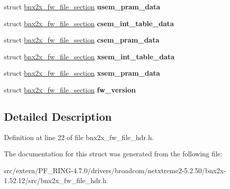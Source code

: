 \begin{DoxyCompactItemize}
\item 
\hypertarget{structbnx2x__fw__file__hdr_a993f2b8d13947e0118b306cea22eec4c}{
struct \hyperlink{structbnx2x__fw__file__section}{bnx2x\_\-fw\_\-file\_\-section} {\bfseries usem\_\-pram\_\-data}}
\label{structbnx2x__fw__file__hdr_a993f2b8d13947e0118b306cea22eec4c}

\item 
\hypertarget{structbnx2x__fw__file__hdr_a7b1ad7e3573b602c75390317b847220a}{
struct \hyperlink{structbnx2x__fw__file__section}{bnx2x\_\-fw\_\-file\_\-section} {\bfseries csem\_\-int\_\-table\_\-data}}
\label{structbnx2x__fw__file__hdr_a7b1ad7e3573b602c75390317b847220a}

\item 
\hypertarget{structbnx2x__fw__file__hdr_ac31ca45365a5720fa33b10687125d48f}{
struct \hyperlink{structbnx2x__fw__file__section}{bnx2x\_\-fw\_\-file\_\-section} {\bfseries csem\_\-pram\_\-data}}
\label{structbnx2x__fw__file__hdr_ac31ca45365a5720fa33b10687125d48f}

\item 
\hypertarget{structbnx2x__fw__file__hdr_ac17a9a4525ab60fc3e0e72f1e7219358}{
struct \hyperlink{structbnx2x__fw__file__section}{bnx2x\_\-fw\_\-file\_\-section} {\bfseries xsem\_\-int\_\-table\_\-data}}
\label{structbnx2x__fw__file__hdr_ac17a9a4525ab60fc3e0e72f1e7219358}

\item 
\hypertarget{structbnx2x__fw__file__hdr_ad24baadc62d1c58d7312791c31cde7f8}{
struct \hyperlink{structbnx2x__fw__file__section}{bnx2x\_\-fw\_\-file\_\-section} {\bfseries xsem\_\-pram\_\-data}}
\label{structbnx2x__fw__file__hdr_ad24baadc62d1c58d7312791c31cde7f8}

\item 
\hypertarget{structbnx2x__fw__file__hdr_a2d5b419dcb47a2601c9222506ba357e9}{
struct \hyperlink{structbnx2x__fw__file__section}{bnx2x\_\-fw\_\-file\_\-section} {\bfseries fw\_\-version}}
\label{structbnx2x__fw__file__hdr_a2d5b419dcb47a2601c9222506ba357e9}

\end{DoxyCompactItemize}


\subsection{Detailed Description}


Definition at line 22 of file bnx2x\_\-fw\_\-file\_\-hdr.h.



The documentation for this struct was generated from the following file:\begin{DoxyCompactItemize}
\item 
src/extern/PF\_\-RING-\/4.7.0/drivers/broadcom/netxtreme2-\/5.2.50/bnx2x-\/1.52.12/src/bnx2x\_\-fw\_\-file\_\-hdr.h\end{DoxyCompactItemize}
